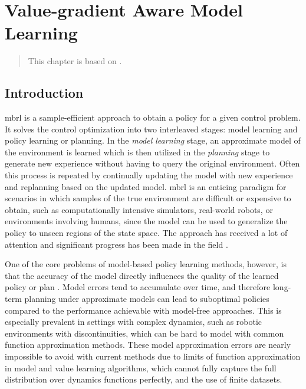\chapter{Value-gradient Aware Model Learning}
\label{chap:vagram}

\begin{quote}
    This chapter is based on .
\end{quote}

\newcommand{\revised}[1]{#1}
\section{Introduction}
\ac{mbrl} is a sample-efficient approach to obtain a policy for a given control problem. 
It solves the control optimization into two interleaved stages: model learning and policy learning or planning. 
In the \emph{model learning} stage, an approximate model of the environment is learned which is then utilized in the \emph{planning} stage to generate new experience without having to query the original environment. 
Often this process is repeated by continually updating the model with new experience and replanning based on the updated model. 
\ac{mbrl} is an enticing paradigm for scenarios in which samples of the true environment are difficult or expensive to obtain, such as computationally intensive simulators, real-world robots, or environments involving humans, since the model can be used to generalize the policy to unseen regions of the state space. 
The approach has received a lot of attention and significant progress has been made in the field \parencite{dyna,deisenroth2011pilco,levine2013guided,hafner2020dream,moerland,schrittwieser2020mastering}.

One of the core problems of model-based policy learning methods, however, is that the accuracy of the model directly influences the quality of the learned policy or plan \parencite{schneider1997exploiting,kearns2002near,ross2012agnostic,talvitie2017self,luo2018algorithmic,janner2019mbpo}. 
Model errors tend to accumulate over time, and therefore long-term planning under approximate models can lead to suboptimal policies compared to the performance achievable with model-free approaches.
This is especially prevalent in settings with complex dynamics, such as robotic environments with discontinuities, which can be hard to model with common function approximation methods.
These model approximation errors are nearly impossible to avoid with current methods due to limits of function approximation in model and value learning algorithms, which cannot fully capture the full distribution over dynamics functions perfectly, and the use of finite datasets.


